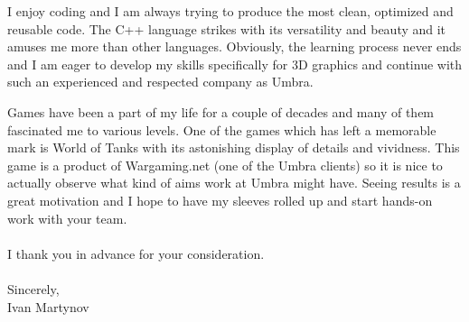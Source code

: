 \documentclass[]{article}
\begin{document}
I enjoy coding and I am always trying to produce the most clean, optimized and
reusable code. The C++ language strikes with its versatility and beauty and it
amuses me more than other languages. Obviously, the learning process never ends
and I am eager to develop my skills specifically for 3D graphics and continue
with such an experienced and respected company as Umbra.

Games have been a part of my life for a couple of decades and many of them
fascinated me to various levels. One of the games which has left a memorable
mark is World of Tanks with its astonishing display of details and vividness.
This game is a product of Wargaming.net (one of the Umbra clients) so it is nice
to actually observe what kind of aims work at Umbra might have. Seeing results
is a great motivation and I hope to have my sleeves rolled up and start
hands-on work with your team.
\\\ \\

\noindent
I thank you in advance for your consideration.\\\ \\

\noindent Sincerely,\\
Ivan Martynov
\end{document}
